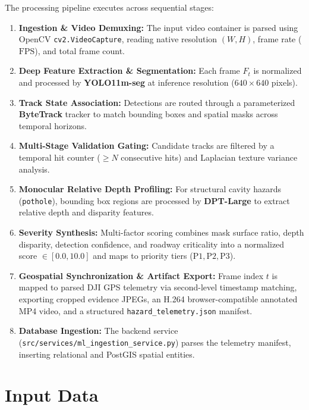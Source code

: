 \documentclass[11pt,a4paper]{article}
\begin{document}
The processing pipeline executes across sequential stages:
\begin{enumerate}[leftmargin=*]
    \item \textbf{Ingestion \& Video Demuxing:} The input video container is parsed using OpenCV \texttt{cv2.VideoCapture}, reading native resolution $(W, H)$, frame rate ($\text{FPS}$), and total frame count.
    \item \textbf{Deep Feature Extraction \& Segmentation:} Each frame $F_t$ is normalized and processed by \textbf{YOLO11m-seg} at inference resolution ($640\times 640$ pixels).
    \item \textbf{Track State Association:} Detections are routed through a parameterized \textbf{ByteTrack} tracker to match bounding boxes and spatial masks across temporal horizons.
    \item \textbf{Multi-Stage Validation Gating:} Candidate tracks are filtered by a temporal hit counter ($\ge N$ consecutive hits) and Laplacian texture variance analysis.
    \item \textbf{Monocular Relative Depth Profiling:} For structural cavity hazards (\texttt{pothole}), bounding box regions are processed by \textbf{DPT-Large} to extract relative depth and disparity features.
    \item \textbf{Severity Synthesis:} Multi-factor scoring combines mask surface ratio, depth disparity, detection confidence, and roadway criticality into a normalized score $\in [0.0, 10.0]$ and maps to priority tiers ($\text{P1}, \text{P2}, \text{P3}$).
    \item \textbf{Geospatial Synchronization \& Artifact Export:} Frame index $t$ is mapped to parsed DJI GPS telemetry via second-level timestamp matching, exporting cropped evidence JPEGs, an H.264 browser-compatible annotated MP4 video, and a structured \texttt{hazard\_telemetry.json} manifest.
    \item \textbf{Database Ingestion:} The backend service (\texttt{src/services/ml\_ingestion\_service.py}) parses the telemetry manifest, inserting relational and PostGIS spatial entities.
\end{enumerate}

\section{Input Data}
\end{document}
